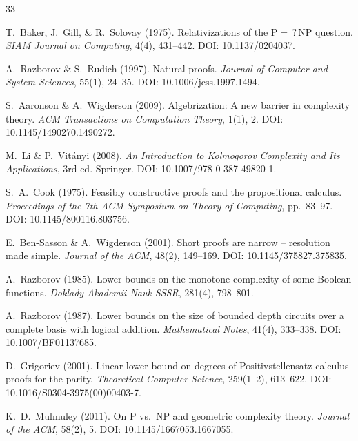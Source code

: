 \documentclass[aps,prd,twocolumn,superscriptaddress,nofootinbib]{revtex4-2}
\theoremstyle{definition}
\theoremstyle{remark}
\begin{document}
\begin{thebibliography}{33}

T.~Baker, J.~Gill, \& R.~Solovay (1975).
Relativizations of the $\mathrm{P} =\mathrel{?} \mathrm{NP}$ question.
\textit{SIAM Journal on Computing}, 4(4), 431--442.
DOI: 10.1137/0204037.

A.~Razborov \& S.~Rudich (1997).
Natural proofs.
\textit{Journal of Computer and System Sciences}, 55(1), 24--35.
DOI: 10.1006/jcss.1997.1494.

S.~Aaronson \& A.~Wigderson (2009).
Algebrization: A new barrier in complexity theory.
\textit{ACM Transactions on Computation Theory}, 1(1), 2.
DOI: 10.1145/1490270.1490272.

M.~Li \& P.~Vit\'anyi (2008).
\textit{An Introduction to Kolmogorov Complexity and Its Applications}, 3rd ed.
Springer.
DOI: 10.1007/978-0-387-49820-1.

S.~A.~Cook (1975).
Feasibly constructive proofs and the propositional calculus.
\textit{Proceedings of the 7th ACM Symposium on Theory of Computing}, pp.\ 83--97.
DOI: 10.1145/800116.803756.

E.~Ben-Sasson \& A.~Wigderson (2001).
Short proofs are narrow -- resolution made simple.
\textit{Journal of the ACM}, 48(2), 149--169.
DOI: 10.1145/375827.375835.

A.~Razborov (1985).
Lower bounds on the monotone complexity of some Boolean functions.
\textit{Doklady Akademii Nauk SSSR}, 281(4), 798--801.

A.~Razborov (1987).
Lower bounds on the size of bounded depth circuits over a complete basis with logical addition.
\textit{Mathematical Notes}, 41(4), 333--338.
DOI: 10.1007/BF01137685.

D.~Grigoriev (2001).
Linear lower bound on degrees of Positivstellensatz calculus proofs for the parity.
\textit{Theoretical Computer Science}, 259(1--2), 613--622.
DOI: 10.1016/S0304-3975(00)00403-7.

K.~D.~Mulmuley (2011).
On P vs.\ NP and geometric complexity theory.
\textit{Journal of the ACM}, 58(2), 5.
DOI: 10.1145/1667053.1667055.


\end{thebibliography}
\end{document}
